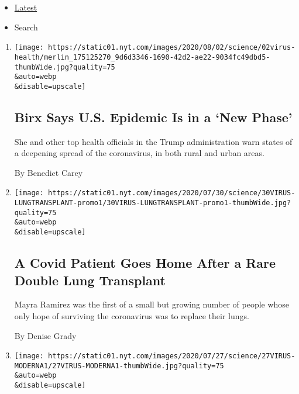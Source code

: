 \begin{itemize}
\tightlist
\item
  \protect\hyperlink{stream-panel}{Latest}
\item
  Search
\end{itemize}

\begin{enumerate}
\def\labelenumi{\arabic{enumi}.}
\item
  \href{/2020/08/02/health/dr-birx-coronavirus-phase.html}{}

  \texttt{[image: https://static01.nyt.com/images/2020/08/02/science/02virus-health/merlin\_175125270\_9d6d3346-1690-42d2-ae22-9034fc49dbd5-thumbWide.jpg?quality=75\\\&auto=webp\\\&disable=upscale]}

  \hypertarget{birx-says-us-epidemic-is-in-a-new-phase}{%
  \subsection{Birx Says U.S. Epidemic Is in a `New
  Phase'}\label{birx-says-us-epidemic-is-in-a-new-phase}}

  She and other top health officials in the Trump administration warn
  states of a deepening spread of the coronavirus, in both rural and
  urban areas.

  By Benedict Carey
\item
  \href{/2020/07/30/health/Covid-lung-transplant.html}{}

  \texttt{[image: https://static01.nyt.com/images/2020/07/30/science/30VIRUS-LUNGTRANSPLANT-promo1/30VIRUS-LUNGTRANSPLANT-promo1-thumbWide.jpg?quality=75\\\&auto=webp\\\&disable=upscale]}

  \hypertarget{a-covid-patient-goes-home-after-a-rare-double-lung-transplant}{%
  \subsection{A Covid Patient Goes Home After a Rare Double Lung
  Transplant}\label{a-covid-patient-goes-home-after-a-rare-double-lung-transplant}}

  Mayra Ramirez was the first of a small but growing number of people
  whose only hope of surviving the coronavirus was to replace their
  lungs.

  By Denise Grady
\item
  \href{/2020/07/27/health/moderna-vaccine-covid.html}{}

  \texttt{[image: https://static01.nyt.com/images/2020/07/27/science/27VIRUS-MODERNA1/27VIRUS-MODERNA1-thumbWide.jpg?quality=75\\\&auto=webp\\\&disable=upscale]}


\end{enumerate}
